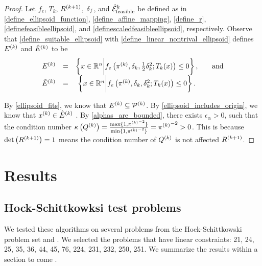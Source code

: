 \documentclass{article}
\begin{document}
\begin{proof}

Let 
$f_e$,
$T_k$,
${R^{(k+1)}}$, $\delta_{f}$, and ${{\mathcal {\hat E}_{\text{feasible}}}^k}$
be defined as in
\cref{define_ellipsoid_function},
\cref{define_affine_mapping},
\cref{define_r},
\cref{definefeasibleellipsoid}, and
\cref{definescaledfeasibleellipsoid},
respectively. 
Observe that \cref{define_suitable_ellipsoid} with \cref{define_linear_nontrival_ellipsoid} defines  ${E^{(k)}}$ and ${{\hat E}^{(k)}}$ to be
\begin{align*}
\begin{array}{cccc}
{E^{(k)}} &=& \left\{x \in \mathbb R^n \bigg | f_e\left(\pi^{(k)}, \delta_k, \frac 1 2 \delta_k^2; T_k(x)\right) \le 0\right\}, &\quad \textrm{and}  \\
{{\hat E}^{(k)}} &=& \left\{x \in \mathbb R^n \bigg | f_e\left({\pi^{(k)}}, \delta_k, \delta_k^2; T_k(x)\right) \le 0\right\}.&
\end{array}
\end{align*}

By \cref{ellipsoid_fits}, we know that ${E^{(k)}} \subseteq {{\mathcal{P}}^{(k)}}$.
By \cref{ellipsoid_includes_origin}, we know that $x^{(k)} \in {{\hat E}^{(k)}}$ .
By \cref{alphas_are_bounded}, there exists $\epsilon_{\alpha} > 0$, such that the condition number 
${\kappa}\left({Q^{(k)}}\right) = \frac{\max\{1, {\pi^{(k)}}^{-2}\}}{\min\{1, {\pi^{(k)}}^{-2}\}} = {\pi^{(k)}}^{-2} > 0$.
This is because $\det\left({R^{(k+1)}}\right) = 1$ means the condition number of ${Q^{(k)}}$ is not affected ${R^{(k+1)}}$.
\end{proof}


\section{Results}


\subsection{Hock-Schittkowksi test problems}


We tested these algorithms on several problems from the Hock-Schittkowski problem set \cite{Schittkowski1981MoreTE} and \cite{Hock1980}.
We selected the problems that have linear constraints: 21, 24, 25, 35, 36, 44, 45, 76, 224, 231, 232, 250, 251.
We summarize the results within \color{magenta} a section to come \color{black}.

\end{document}
